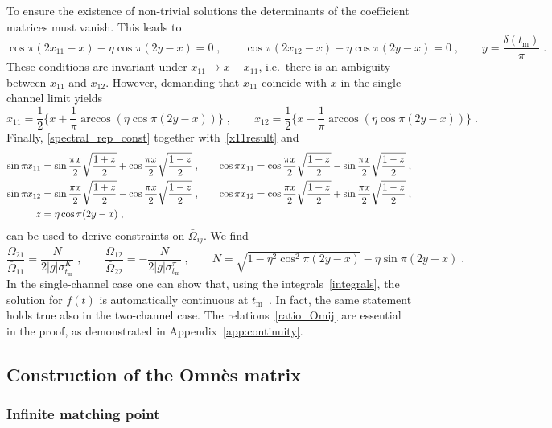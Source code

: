\documentclass[11pt]{article}%
\providecommand{\ec}{\;,}
\providecommand{\ep}{\;.}
\providecommand{\nt}{\notag}
\newcommand{\tm}{t_\text{m}}
\newcommand{\beq}{\begin{equation}}
\newcommand{\eeq}{\end{equation}}
\begin{document}
\noindent
To ensure the existence of non-trivial solutions the determinants of the coefficient matrices must vanish. This leads to
\beq
\cos \pi (2x_{11}-x)-\eta\cos\pi (2y-x)=0\ec\qquad \cos \pi (2x_{12}-x)-\eta\cos\pi (2y-x)=0\ec\qquad y=\frac{\delta(\tm)}{\pi}\ep
\eeq
These conditions are invariant under $x_{11}\to x-x_{11}$, i.e.~there is an ambiguity between $x_{11}$ and $x_{12}$. However, demanding that $x_{11}$ coincide with $x$ in the single-channel limit yields
\beq
\label{x11result}
x_{11}=\frac{1}{2}\Big\{x+\frac{1}{\pi}\arccos(\eta\cos\pi(2y-x))\Big\}\ec\qquad x_{12}=\frac{1}{2}\Big\{x-\frac{1}{\pi}\arccos(\eta\cos\pi(2y-x))\Big\}\ep
\eeq
Finally, \eqref{spectral_rep_const} together with~\eqref{x11result} and
\begin{align}
\label{sinx11}
 \sin\pi x_{11}&=\sin\frac{\pi x}{2}\sqrt{\frac{1+z}{2}}+\cos\frac{\pi x}{2}\sqrt{\frac{1-z}{2}}\ec\qquad
 \cos\pi x_{11}=\cos\frac{\pi x}{2}\sqrt{\frac{1+z}{2}}-\sin\frac{\pi x}{2}\sqrt{\frac{1-z}{2}}\ec\nt\\
\sin\pi x_{12}&=\sin\frac{\pi x}{2}\sqrt{\frac{1+z}{2}}-\cos\frac{\pi x}{2}\sqrt{\frac{1-z}{2}}\ec\qquad
 \cos\pi x_{12}=\cos\frac{\pi x}{2}\sqrt{\frac{1+z}{2}}+\sin\frac{\pi x}{2}\sqrt{\frac{1-z}{2}}\ec\nt\\
z&=\eta\cos\pi(2y-x)\ec
\end{align}
 can be used to derive constraints on $\bar\Omega_{ij}$. We find
\beq
\label{ratio_Omij}
 \frac{\bar\Omega_{21}}{\bar\Omega_{11}}=\frac{N}{2|g|\sigma_{\tm}^K}\ec\qquad
 \frac{\bar\Omega_{12}}{\bar\Omega_{22}}=-\frac{N}{2|g|\sigma_{\tm}^\pi}\ec\qquad N=\sqrt{1-\eta^2\cos^2\pi(2y-x)}-\eta\sin\pi(2y-x)\ep
\eeq
In the single-channel case one can show that, using the integrals~\eqref{integrals},
the solution for $f(t)$ is automatically continuous at $\tm$~\cite{BDM04}. In fact, the same statement holds true also in the two-channel case. The relations~\eqref{ratio_Omij} are essential in the proof, as demonstrated in Appendix~\ref{app:continuity}.


\subsection{Construction of the Omn\`es matrix}

\subsubsection{Infinite matching point}
\end{document}
